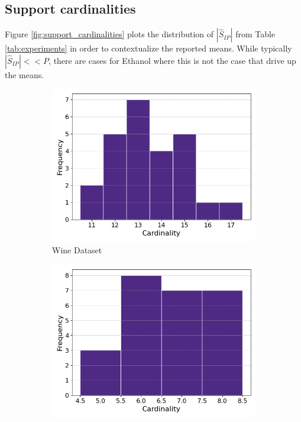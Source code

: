 \newpage

\subsection{Support cardinalities}
\label{sec:support_cardinalities}

Figure \ref{fig:support_cardinalities} plots the distribution of $|\widehat{S}_{IP}|$ from Table \ref{tab:experiments} in order to contextualize the reported means.
While typically $|\widehat{S}_{IP}| << P$, there are cases for Ethanol where this is not the case that drive up the means.

\begin{figure}[t]
    \centering
    \begin{subfigure}[b]{0.3\textwidth}
        \centering
        \includegraphics[width=\textwidth]{../figures/wine_cardinalities}
        \caption{Wine Dataset}
        \label{fig:wine_cardinalities}
    \end{subfigure}
    \hfill
    \begin{subfigure}[b]{0.3\textwidth}
        \centering
        \includegraphics[width=\textwidth]{..//figures/iris_cardinalities}

\end{subfigure}
\end{figure}
